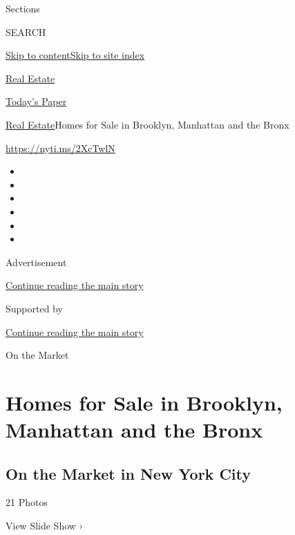 Sections

SEARCH

\protect\hyperlink{site-content}{Skip to
content}\protect\hyperlink{site-index}{Skip to site index}

\href{https://www.nytimes3xbfgragh.onion/section/realestate}{Real
Estate}

\href{https://myaccount.nytimes3xbfgragh.onion/auth/login?response_type=cookie\&client_id=vi}{}

\href{https://www.nytimes3xbfgragh.onion/section/todayspaper}{Today's
Paper}

\href{/section/realestate}{Real Estate}\textbar{}Homes for Sale in
Brooklyn, Manhattan and the Bronx

\url{https://nyti.ms/2XcTwlN}

\begin{itemize}
\item
\item
\item
\item
\item
\item
\end{itemize}

Advertisement

\protect\hyperlink{after-top}{Continue reading the main story}

Supported by

\protect\hyperlink{after-sponsor}{Continue reading the main story}

On the Market

\hypertarget{homes-for-sale-in-brooklyn-manhattan-and-the-bronx}{%
\section{Homes for Sale in Brooklyn, Manhattan and the
Bronx}\label{homes-for-sale-in-brooklyn-manhattan-and-the-bronx}}

\href{https://www.nytimes3xbfgragh.onion/slideshow/2020/07/30/realestate/on-the-market-in-new-york-city.html}{}

\hypertarget{on-the-market-in-new-york-city}{%
\subsection{On the Market in New York
City}\label{on-the-market-in-new-york-city}}

21 Photos

View Slide Show ›

